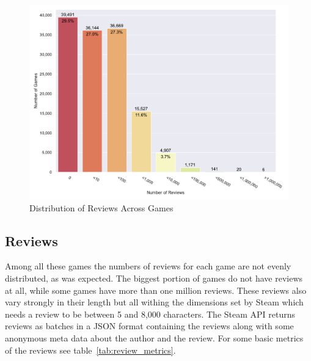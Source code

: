 \documentclass[11pt, a4paper]{article}
\begin{document}

\begin{figure}
    \centering
    \includegraphics[width=\textwidth]{data/results/plots/review_plot}
    \caption{Distribution of Reviews Across Games}
    \label{fig:review_fig}
\end{figure}


\subsection{Reviews}\label{subsec:reviews}
Among all these games the numbers of reviews for each game are not evenly distributed, as was expected.
The biggest portion of games do not have reviews at all, while some games have more than one million reviews.
These reviews also vary strongly in their length but all withing the dimensions set by Steam which needs a review to
be between 5 and 8,000 characters.
The Steam API returns reviews as batches in a JSON format containing the reviews along with some anonymous meta data
about the author and the review.
For some basic metrics of the reviews see table~\ref{tab:review_metrics}.


\end{document}
